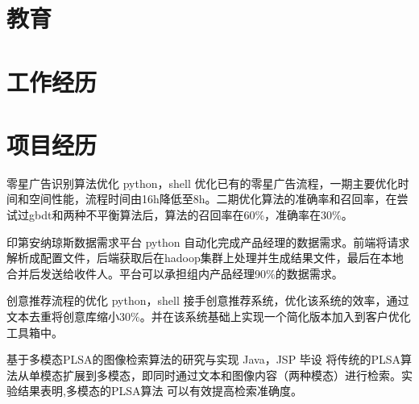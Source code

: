 \documentclass[11pt,a4paper]{moderncv}
\title{}               %
\begin{document}
\maketitle

\section{教育}

\section{工作经历}


\section{项目经历}
\renewcommand{\baselinestretch}{1.2}
{零星广告识别算法优化}
{python，shell}
{}{}
{优化已有的零星广告流程，一期主要优化时间和空间性能，流程时间由16h降低至8h。二期优化算法的准确率和召回率，在尝试过gbdt和两种不平衡算法后，算法的召回率在60\%，准确率在30\%。}

\vspace*{0.2\baselineskip}
{印第安纳琼斯数据需求平台}
{python}
{}{}
{自动化完成产品经理的数据需求。前端将请求解析成配置文件，后端获取后在hadoop集群上处理并生成结果文件，最后在本地合并后发送给收件人。平台可以承担组内产品经理90\%的数据需求。}

\vspace*{0.2\baselineskip}
{创意推荐流程的优化}
{python，shell}
{}{}
{接手创意推荐系统，优化该系统的效率，通过文本去重将创意库缩小30\%。并在该系统基础上实现一个简化版本加入到客户优化工具箱中。}

\vspace*{0.2\baselineskip}
{基于多模态PLSA的图像检索算法的研究与实现}
{Java，JSP}
{毕设}{}
{将传统的PLSA算法从单模态扩展到多模态，即同时通过文本和图像内容（两种模态）进行检索。实验结果表明,多模态的PLSA算法 可以有效提高检索准确度。}
\end{document}
